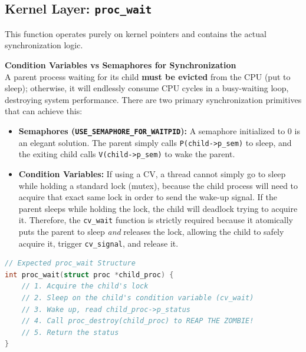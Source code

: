 \subsection{Kernel Layer: \texttt{proc\_wait}}
This function operates purely on kernel pointers and contains the actual synchronization logic.

\textbf{Condition Variables vs Semaphores for Synchronization}\\
A parent process waiting for its child \textbf{must be evicted} from the CPU (put to sleep); otherwise, it will endlessly consume CPU cycles in a busy-waiting loop, destroying system performance. There are two primary synchronization primitives that can achieve this:
\begin{itemize}
    \item \textbf{Semaphores (\texttt{USE\_SEMAPHORE\_FOR\_WAITPID}):} A semaphore initialized to 0 is an elegant solution. The parent simply calls \texttt{P(child->p\_sem)} to sleep, and the exiting child calls \texttt{V(child->p\_sem)} to wake the parent.
    \item \textbf{Condition Variables:} If using a CV, a thread cannot simply go to sleep while holding a standard lock (mutex), because the child process will need to acquire that exact same lock in order to send the wake-up signal. If the parent sleeps while holding the lock, the child will deadlock trying to acquire it. Therefore, the \texttt{cv\_wait} function is strictly required because it atomically puts the parent to sleep \textit{and} releases the lock, allowing the child to safely acquire it, trigger \texttt{cv\_signal}, and release it.
\end{itemize}

\begin{lstlisting}[language=C]
// Expected proc_wait Structure
int proc_wait(struct proc *child_proc) {
    // 1. Acquire the child's lock
    // 2. Sleep on the child's condition variable (cv_wait)
    // 3. Wake up, read child_proc->p_status
    // 4. Call proc_destroy(child_proc) to REAP THE ZOMBIE!
    // 5. Return the status
}
\end{lstlisting}

